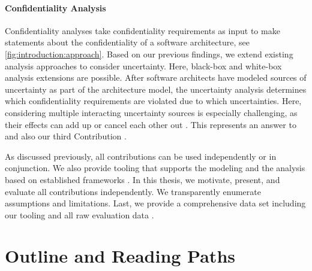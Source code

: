 \paragraph{Confidentiality Analysis}
Confidentiality analyses take confidentiality requirements as input to make statements about the confidentiality of a software architecture, see \autoref{fig:introduction:approach}.
Based on our previous findings, we extend existing analysis approaches \cite{seifermann_detecting_2022,boltz_extensible_2024} to consider uncertainty.
Here, black-box \cite{walter_architectural_2022} and white-box \cite{hahner_model-based_2023} analysis extensions are possible.
After software architects have modeled sources of uncertainty as part of the architecture model, the uncertainty analysis determines which confidentiality requirements are violated due to which uncertainties.
Here, considering multiple interacting uncertainty sources is especially challenging, as their effects can add up or cancel each other out \cite{camara_uncertainty_2022,camara_addressing_2022}.
This represents an answer to  and also our third Contribution .

As discussed previously, all contributions can be used independently or in conjunction.
We also provide tooling that supports the modeling and the analysis based on established frameworks \cite{reussner_modeling_2016,reussner_palladio_2024}.
In this thesis, we motivate, present, and evaluate all contributions independently.
We transparently enumerate assumptions and limitations.
Last, we provide a comprehensive data set including our tooling and all raw evaluation data \cite{dataset}.




\section{Outline and Reading Paths}%
\label{sec:introduction:outline}

